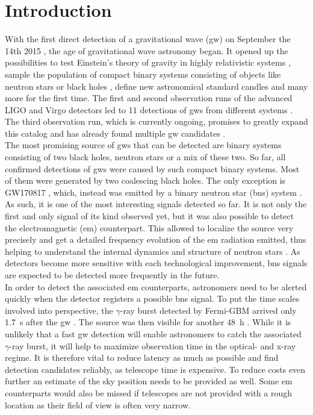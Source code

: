 \section{Introduction}
With the first direct detection of a gravitational wave (\gls{gw}) on September the 14th 2015 \cite{gw150914}, the age of gravitational wave astronomy began. It opened up the possibilities to test Einstein's theory of gravity in highly relativistic systems \cite{test_gr_gw150914}, sample the population of compact binary systems consisting of objects like neutron stars or black holes \cite{population_binary_systems}, define new astronomical standard candles \cite{standard_candles} and many more for the first time. The first and second observation runs of the advanced LIGO and Virgo detectors \cite{aligo, avirgo} led to 11 detections of \gls{gw}s from different systems \cite{catalog}. The third observation run, which is currently ongoing, promises to greatly expand this catalog and has already found multiple \gls{gw} candidates \cite{o3_alerts}.\\
The most promising source of \gls{gw}s that can be detected are binary systems consisting of two black holes, neutron stars or a mix of these two. So far, all confirmed detections of \gls{gw}s were caused by such compact binary systems. Most of them were generated by two coalescing black holes. The only exception is GW170817 \cite{catalog}, which, instead was emitted by a binary neutron star (\gls{bns}) system \cite{gw170817}. As such, it is one of the most interesting signals detected so far. It is not only the first and only signal of its kind observed yet, but it was also possible to detect the electromagnetic (\gls{em}) counterpart. This allowed to localize the source very precisely and get a detailed frequency evolution of the \gls{em} radiation emitted, thus helping to understand the internal dynamics and structure of neutron stars \cite{multi_messanger}. As detectors become more sensitive with each technological improvement, \gls{bns} signals are expected to be detected more frequently in the future.\\
In order to detect the associated \gls{em} counterparts, astronomers need to be alerted quickly when the detector registers a possible \gls{bns} signal. To put the time scales involved into perspective, the $\gamma$-ray burst detected by Fermi-GBM arrived only \SI{1.7}{\s} after the \gls{gw} \cite{gw170817}. The source was then visible for another \SI{48}{\hour} \cite{multi_messanger}. While it is unlikely that a fast \gls{gw} detection will enable astronomers to catch the associated $\gamma$-ray burst, it will help to maximize observation time in the optical- and x-ray regime. It is therefore vital to reduce latency as much as possible and find detection candidates reliably, as telescope time is expensive. To reduce costs even further an estimate of the sky position needs to be provided as well. Some \gls{em} counterparts would also be missed if telescopes are not provided with a rough location as their field of view is often very narrow.\\
